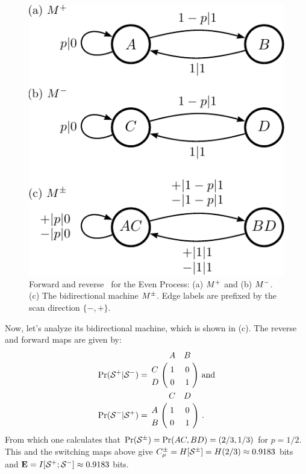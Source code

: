\begin{figure}[th]
\centering
\includegraphics[scale=\figscale]{EvenProcess}
\caption{
  Forward and reverse \eMs\ for the Even Process: (a) ${M}^{+}$ and
  (b) ${M}^{-}$. (c) The bidirectional machine ${M}^{\pm}$.
  Edge labels are prefixed by the scan direction $\{-,+\}$.
  }
\label{fig:EvenProcess}
\end{figure}

Now, let's analyze its bidirectional machine, which is shown in 
(c). The reverse and forward maps are given by:
\begin{align*}
\Pr(\FutureCausalState|\PastCausalState) &=
  \bordermatrix{%
      & A & B \cr
    C & 1 & 0 \cr
    D & 0 & 1
  }
  \mathrm{~and}\\
\Pr(\PastCausalState|\FutureCausalState) &=
  \bordermatrix{%
      & C & D \cr
    A & 1 & 0 \cr
    B & 0 & 1
  } ~.
\end{align*}
From which one calculates that
$\Pr({\mathcal{S}}^{\pm}) = \Pr(AC,BD) = \left(2/3,1/3\right)$ for $p=1/2$. 
This and the switching maps above give 
    $C_\mu^{\pm} = H[{\mathcal{S}}^{\pm}] = H(2/3) \approx 0.9183$
bits and ${\bf E} = I[{\mathcal{S}}^{+};{\mathcal{S}}^{-}] \approx 0.9183$ bits.

